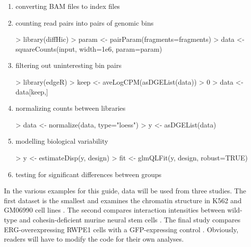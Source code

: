 \documentclass[12pt]{report}
\renewenvironment{Schunk}{\vspace{0pt}}{\vspace{0pt}}
\begin{document}
\begin{enumerate}
\item converting BAM files to index files
\item counting read pairs into pairs of genomic bins
\begin{Schunk}
\begin{Sinput}
> library(diffHic)
> param <- pairParam(fragments=fragments)
> data <- squareCounts(input, width=1e6, param=param)
\end{Sinput}
\end{Schunk}
\item filtering out uninteresting bin pairs
\begin{Schunk}
\begin{Sinput}
> library(edgeR)
> keep <- aveLogCPM(asDGEList(data)) > 0
> data <- data[keep,]
\end{Sinput}
\end{Schunk}
\item normalizing counts between libraries
\begin{Schunk}
\begin{Sinput}
> data <- normalize(data, type="loess")
> y <- asDGEList(data)
\end{Sinput}
\end{Schunk}
\item modelling biological variability
\begin{Schunk}
\begin{Sinput}
> y <- estimateDisp(y, design)
> fit <- glmQLFit(y, design, robust=TRUE)
\end{Sinput}
\end{Schunk}
\item testing for significant differences between groups
\begin{Schunk}
\end{Schunk}
\end{enumerate}
In the various examples for this guide, data will be used from three studies. 
The first dataset is the smallest and examines the chromatin structure in K562 and GM06990 cell lines \citep{lieberman2009comprehensive}.
The second compares interaction intensities between wild-type and cohesin-deficient murine neural stem cells \citep{sofueva2013cohesin}. 
The final study  compares ERG-overexpressing RWPE1 cells with a GFP-expressing control \citep{rickman2012oncogene}.
Obviously, readers will have to modify the code for their own analyses.
\end{document}
